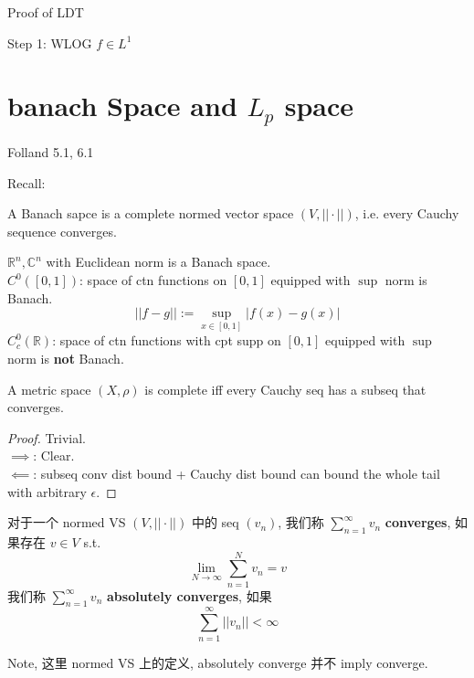 \documentclass[lang=cn,11pt]{elegantbook}
\begin{document}
Proof of LDT

Step 1: WLOG $f \in L^1$














\chapter{banach Space and $L_p$ space}
Folland 5.1, 6.1

Recall:
\begin{definition}
    A Banach sapce is a complete normed vector space $(V, ||\cdot||)$, i.e. every Cauchy sequence converges.
\end{definition}

\begin{example}
    $\mathbb{R}^n, \mathbb{C}^n$ with Euclidean norm is a Banach space.\\
    $C^0([0,1])$: space of ctn functions on $[0,1]$ equipped with $\sup$ norm is Banach. \[
    ||f- g|| := \sup_{x\in[0,1]} |f(x) - g(x)|
    \]
    $C^0_c(\mathbb{R})$: space of ctn functions with cpt supp on $[0,1]$ equipped with $\sup$ norm is \textbf{not} Banach.
    
\end{example}

\begin{lemma}
    A metric space $(X,\rho)$ is complete iff every Cauchy seq has a subseq that converges.
\end{lemma}
\begin{proof}
Trivial. \\
\(\implies\): Clear. \\
\(\impliedby\): subseq conv dist bound + Cauchy dist bound can bound the whole tail with arbitrary $\epsilon$.
\end{proof}

\begin{definition}
对于一个 normed VS $(V,||\cdot||)$ 中的 seq $(v_n)$, 我们称 \(\sum_{n=1}^\infty v_n\) \textbf{converges}, 如果存在 $v\in V$ s.t. \[
\lim_{N\to\infty} \sum_{n=1}^N v_n  = v
\]
我们称 \(\sum_{n=1}^\infty v_n\) \textbf{absolutely converges}, 如果 \[ \sum_{n=1}^\infty ||v_n|| < \infty\]
\end{definition}
\begin{remark}
    Note, 这里 normed VS 上的定义, absolutely converge 并不 imply converge. 
\end{remark}
\end{document}
